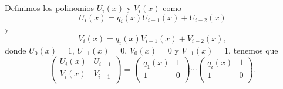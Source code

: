 Definimos los polinomios $U_i(x)$ y $V_i(x)$ como
\begin{equation}
    \label{alg:euclides-u}
    U_i(x) = q_i(x)U_{i-1}(x) + U_{i-2}(x)
\end{equation}
y
\[
    V_i(x) = q_i(x)V_{i-1}(x) + V_{i-2}(x),
\]
donde $U_0(x) = 1$, $U_{-1}(x) = 0$, $V_0(x) = 0$ y $V_{-1}(x) = 1$, tenemos que
\begin{equation}
    \label{alg:euclides-u-v}
    \left( 
        \begin{array}{cc}  
            U_i(x) & U_{i-1} \\
            V_i(x) & V_{i-1} \\
        \end{array} 
    \right)
    = 
    \left( 
        \begin{array}{cc}  
            q_{1}(x) & 1 \\
            1 & 0 \\
        \end{array} 
    \right)
    \cdots
    \left( 
        \begin{array}{cc}  
            q_{i}(x) & 1 \\
            1 & 0 \\
        \end{array} 
    \right).
\end{equation}


